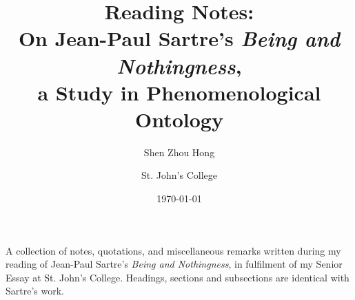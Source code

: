 \documentclass[
  10pt,       %
  letterpaper,    %
  final,      %
  onecolumn,  %
  oneside,    %
  notitlepage %
]{book}
\title{
  \textbf{Reading Notes:} \\
  On Jean-Paul Sartre's \emph{Being and Nothingness},\\
  a Study in Phenomenological Ontology
}
\author{
  Shen Zhou Hong \and St. John's College
}
\date{\today}
\begin{document}
\pagestyle{plain}
\maketitle
\noindent
A collection of notes, quotations, and miscellaneous remarks written during my reading of Jean-Paul Sartre's \emph{Being and Nothingness}, in fulfilment of my Senior Essay at St. John's College. Headings, sections and subsections are identical with Sartre's work.
\tableofcontents %

% 

\pagestyle{fancy}




\setlength{\headwidth}{\textwidth}
\addtolength{\headwidth}{\marginparsep}
\addtolength{\headwidth}{\marginparwidth}

\pagestyle{fancy}











\restoregeometry
\setlength{\headwidth}{\textwidth}
\pagestyle{plain}

\appendix

% 


\end{document}
